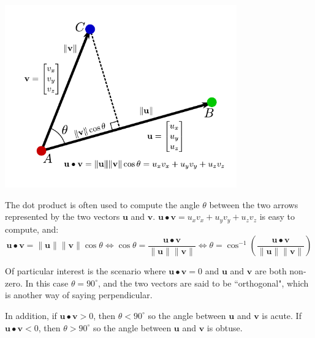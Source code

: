 \documentclass{article}
\begin{document}
\begin{center}
\includegraphics[width = 0.75\textwidth]{displacement_vector_dot_product}
\end{center}

The dot product is often used to compute the angle \(\theta\) between the two arrows represented by the two vectors \(\mathbf{u}\) and \(\mathbf{v}\). \(\mathbf{u} \bullet \mathbf{v} = u_x v_x + u_y v_y + u_z v_z\) is easy to compute, and:
\[\mathbf{u} \bullet \mathbf{v} = \|\mathbf{u}\|\|\mathbf{v}\|\cos\theta \iff \cos\theta = \frac{\mathbf{u} \bullet \mathbf{v}}{\|\mathbf{u}\| \|\mathbf{v}\|} \iff \theta = \cos^{-1}\left(\frac{\mathbf{u} \bullet \mathbf{v}}{\|\mathbf{u}\| \|\mathbf{v}\|}\right)\] 

Of particular interest is the scenario where \(\mathbf{u} \bullet \mathbf{v} = 0\) and \(\mathbf{u}\) and \(\mathbf{v}\) are both non-zero. In this case \(\theta = 90^\circ\), and the two vectors are said to be ``orthogonal", which is another way of saying perpendicular.

In addition, if \(\mathbf{u} \bullet \mathbf{v} > 0\), then \(\theta < 90^\circ\) so the angle between \(\mathbf{u}\) and \(\mathbf{v}\) is acute. If \(\mathbf{u} \bullet \mathbf{v} < 0\), then \(\theta > 90^\circ\) so the angle between \(\mathbf{u}\) and \(\mathbf{v}\) is obtuse.
\end{document}
